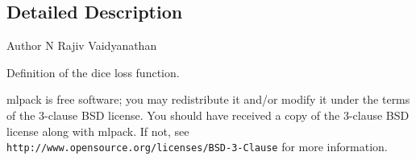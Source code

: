 \subsection{Detailed Description}
\begin{DoxyAuthor}{Author}
N Rajiv Vaidyanathan
\end{DoxyAuthor}
Definition of the dice loss function.

mlpack is free software; you may redistribute it and/or modify it under the terms of the 3-\/clause B\+SD license. You should have received a copy of the 3-\/clause B\+SD license along with mlpack. If not, see {\tt http\+://www.\+opensource.\+org/licenses/\+B\+S\+D-\/3-\/\+Clause} for more information. 